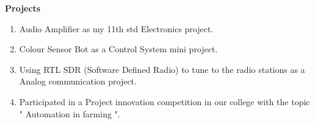 \documentclass[12pt]{article}
\begin{document}
\begin{flushleft}
\vspace{8mm} 
\textbf{Projects}\\
\begin{enumerate}
	\item Audio Amplifier as my 11th std Electronics project.
	\item Colour Sensor Bot as a Control System mini project.
	\item Using RTL SDR (Software Defined Radio) to tune to the radio stations as a Analog communication project.
	\item Participated in a Project innovation competition in our college with the topic " Automation in farming ".
	
\end{enumerate}
\end{flushleft}
\end{document}
